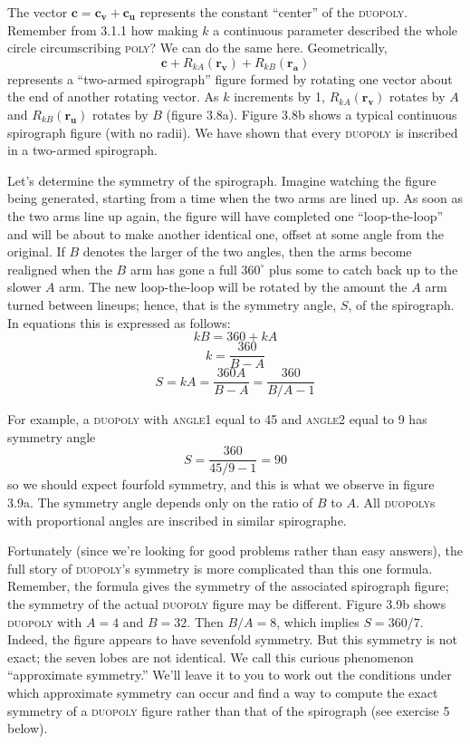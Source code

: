 \documentclass{book}
\begin{document}
The vector $\mathbf{c} = \mathbf{c_v} + \mathbf{c_u}$ represents the constant ``center'' of the
\textsc{duopoly}. Remember from 3.1.1 how making $k$ a continuous parameter
described the whole circle circumscribing \textsc{poly}? We can do the same
here. Geometrically, $$\mathbf{c} + R_{kA}(\mathbf{r_v}) + R_{kB}(\mathbf{r_a})$$ represents a ``two-armed spirograph'' figure formed by rotating one vector about the end of another rotating vector. As $k$ increments by 1,
$R_{kA}(\mathbf{r_v})$ rotates by $A$ and $R_{kB}(\mathbf{r_u})$ rotates by $B$ (figure 3.8a). Figure
3.8b shows a typical continuous spirograph figure (with no radii). We
have shown that every \textsc{duopoly} is inscribed in a two-armed spirograph.

Let's determine the symmetry of the spirograph. Imagine watching
the figure being generated, starting from a time when the two arms
are lined up. As soon as the two arms line up again, the figure will
have completed one ``loop-the-loop'' and will be about to make another
identical one, offset at some angle from the original. If $B$ denotes the
larger of the two angles, then the arms become realigned when the $B$
arm has gone a full $360^{\circ}$ plus some to catch back up to the slower $A$
arm. The new loop-the-loop will be rotated by the amount the $A$ arm
turned between lineups; hence, that is the symmetry angle, $S$, of the
spirograph. In equations this is expressed as follows:$$kB = 360 + kA$$ $$k = \frac{360}{B-A}$$ $$S = kA = \frac{360A}{B-A} = \frac{360}{B/A - 1}$$

For example, a \textsc{duopoly} with \textsc{angle1} equal to 45 and \textsc{angle2} equal
to 9 has symmetry angle $$S = \frac{360}{45/9 - 1} = 90 $$ so we should expect fourfold symmetry, and this is what we observe in
figure 3.9a. The symmetry angle depends only on the ratio of $B$ to $A$. All
\textsc{duopoly}s with proportional angles are inscribed in similar spirographe.

Fortunately (since we're looking for good problems rather than easy
answers), the full story of \textsc{duopoly}'s symmetry is more complicated than
this one formula. Remember, the formula gives the symmetry of the
associated spirograph figure; the symmetry of the actual \textsc{duopoly} figure
may be different. Figure 3.9b shows \textsc{duopoly} with $A = 4$ and $B = 32$.
Then $B/A = 8$, which implies $S = 360/7$. Indeed, the figure appears
to have sevenfold symmetry. But this symmetry is not exact; the seven
lobes are not identical. We call this curious phenomenon ``approximate
symmetry.'' We'll leave it to you to work out the conditions under which
approximate symmetry can occur and find a way to compute the exact
symmetry of a \textsc{duopoly} figure rather than that of the spirograph (see
exercise 5 below).
\end{document}
